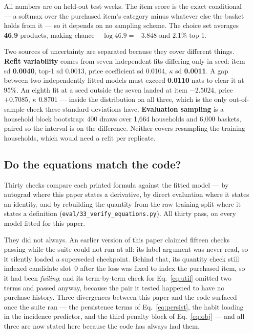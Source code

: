 \documentclass[11pt]{article}
\newcommand{\code}[1]{\texttt{#1}}
\begin{document}
All numbers are on held-out test weeks. The item score is the exact conditional --- a
softmax over the purchased item's category minus whatever else the basket holds from it ---
so it depends on no sampling scheme. The choice set averages \textbf{46.9} products, making
chance $-\log 46.9=-3.848$ and $2.1\%$ top-1.

Two sources of uncertainty are separated because they cover different things. \textbf{Refit
variability} comes from seven independent fits differing only in seed: item sd
\textbf{0.0040}, top-1 sd 0.0013, price coefficient sd 0.0104, $\kappa$ sd \textbf{0.0011}.
A gap between two independently fitted models must exceed \textbf{0.0110} nats to clear it
at 95\%. An eighth fit at a seed outside the seven landed at item $-2.5024$, price $+0.7085$,
$\kappa$ $0.8701$ --- inside the distribution on all three, which is the only out-of-sample
check these standard deviations have. \textbf{Evaluation sampling} is a household block
bootstrap: 400 draws over 1{,}664 households and 6{,}000 baskets, paired so the interval is
on the difference. Neither covers resampling the training households, which would need a
refit per replicate.

\subsection{Do the equations match the code?}
\label{sec:verify}

Thirty checks compare each printed formula against the fitted model --- by autograd where
this paper states a derivative, by direct evaluation where it states an identity, and by
rebuilding the quantity from the raw training split where it states a definition
(\code{eval/33\_verify\_equations.py}). All thirty pass, on every model fitted
for this paper.

They did not always. An earlier version of this paper claimed fifteen checks passing while
the suite could not run at all: its label argument was never read, so it silently loaded a
superseded checkpoint. Behind that, its quantity check still indexed candidate slot~0 after
the loss was fixed to index the purchased item, so it had been \emph{failing}; and its
term-by-term check for Eq.~\ref{eq:util} omitted two terms and passed anyway, because the
pair it tested happened to have no purchase history. Three divergences between this paper
and the code surfaced once the suite ran --- the persistence terms of Eq.~\ref{eq:persist},
the habit loading in the incidence predictor, and the third penalty block of
Eq.~\ref{eq:obj} --- and all three are now stated here because the code has always had them.
\end{document}
